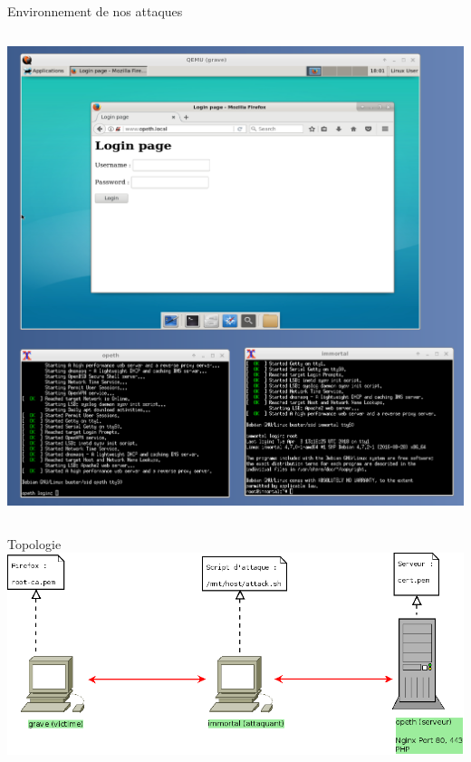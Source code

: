 \begin{frame}[fragile]{Environnement de nos attaques}
\begin{columns}
    \begin{column}{0.5\textwidth}
      \includegraphics[width=\linewidth]{../medias/qemunet.png}
    \end{column}
  \end{columns}

\end{frame}


\begin{frame}{Topologie}
    \includegraphics[width=\linewidth]{../medias/topology.png}
\end{frame}
